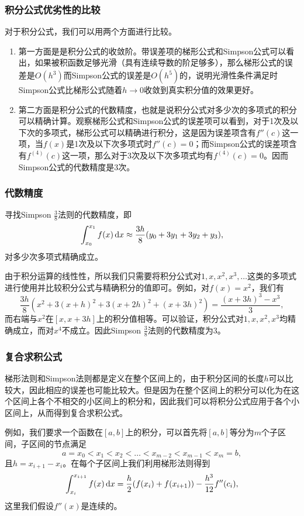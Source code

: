 \documentclass[10pt]{beamer}
\def\dx{\,{\rm d}x}
\begin{document}
\begin{frame}
\frametitle{积分公式优劣性的比较}
对于积分公式，我们可以用两个方面进行比较。
\begin{enumerate}
\item 第一方面是是积分公式的收敛阶。带误差项的梯形公式和Simpson公式可以看出，如果被积函数足够光滑（具有连续导数的阶足够多），那么梯形公式的误差是$O(h^3)$而Simpson公式的误差是$O(h^5)$的，说明光滑性条件满足时Simpson公式比梯形公式随着$h \rightarrow 0$收敛到真实积分值的效果更好。
\item 第二方面是积分公式的代数精度，也就是说积分公式对多少次的多项式的积分可以精确计算。观察梯形公式和Simpson公式的误差项可以看到，对于1次及以下次的多项式，梯形公式可以精确进行积分，这是因为误差项含有$f''(c)$这一项，当$f(x)$是1次及以下次多项式时$f''(c) = 0$；而Simpson公式的误差项含有$f^{(4)}(c)$这一项，那么对于3次及以下次多项式均有$f^{(4)}(c)=0$。因而Simpson公式的代数精度是3次。
\end{enumerate}
\end{frame}


\begin{frame}
\frametitle{代数精度}
\begin{example}
寻找Simpson $\frac{3}{8}$法则的代数精度，即
\begin{equation}
\int_{x_0}^{x_1} f(x) \dx \approx \frac{3h}{8}(y_0 + 3y_1 + 3y_2 + y_3),
\end{equation}
对多少次多项式精确成立。
\end{example}
由于积分运算的线性性，所以我们只需要将积分公式对$1, x, x^2, x^3, \ldots$这类的多项式进行使用并比较积分公式与精确积分的值即可。例如，对$f(x) = x^2$，我们有
\begin{equation}
\frac{3h}{8}(x^2 + 3(x+h)^2 + 3(x+2h)^2 + (x+3h)^2) = \frac{(x+ 3h)^3 - x^3}{3},
\end{equation}
而右端与$x^2$在$[x, x+3h]$上的积分值相等。可以验证，积分公式对$1, x, x^2, x^3$均精确成立，而对$x^4$不成立。因此Simpson $\frac{3}{8}$法则的代数精度为$3$。
\end{frame}


\begin{frame}
\frametitle{复合求积公式}
梯形法则和Simpson法则都是定义在整个区间上的，由于积分区间的长度$h$可以比较大，因此相应的误差也可能比较大。但是因为在整个区间上的积分可以化为在这个区间上各个不相交的小区间上的积分和，因此我们可以将积分公式应用于各个小区间上，从而得到复合求积公式。

\vspace{0.2cm}

例如，我们要求一个函数在$[a,b]$上的积分，可以首先将$[a,b]$等分为$m$个子区间，子区间的节点满足
\begin{equation}
a = x_0 < x_1 < x_2 < \ldots < x_{m-2} < x_{m-1} < x_m = b,
\end{equation}
且$h = x_{i+1} - x_i$。在每个子区间上我们利用梯形法则得到
\begin{equation}
\int_{x_i}^{x_{i+1}} f(x) \dx = \frac{h}{2}( f(x_i) + f(x_{i+1})) - \frac{h^3}{12} f''(c_i),
\end{equation}
这里我们假设$f''(x)$是连续的。
\end{frame}
\end{document}
